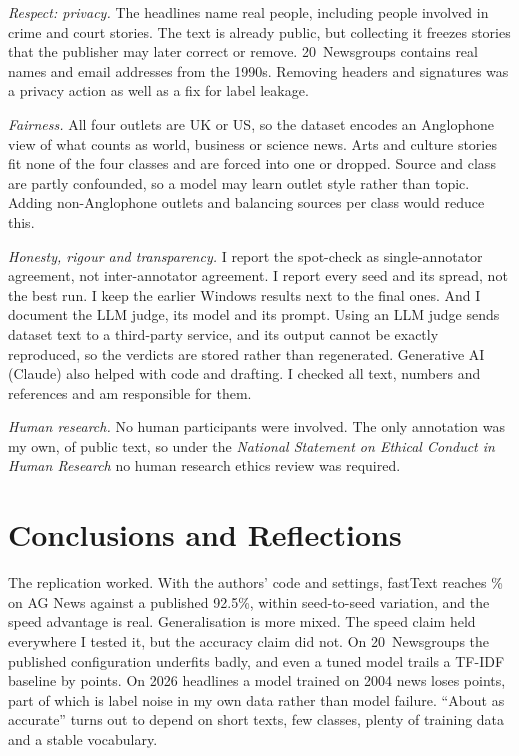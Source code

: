 \documentclass[11pt]{article}
\begin{document}
\emph{Respect: privacy.} The headlines name real people, including people involved in crime
and court stories. The text is already public, but collecting it freezes stories that the
publisher may later correct or remove. 20~Newsgroups contains real names and email addresses
from the 1990s. Removing headers and signatures was a privacy action as well as a fix for
label leakage.

\emph{Fairness.} All four outlets are UK or US, so the dataset encodes an Anglophone view of
what counts as world, business or science news. Arts and culture stories fit none of the four
classes and are forced into one or dropped. Source and class are partly confounded, so a
model may learn outlet style rather than topic. Adding non-Anglophone outlets and balancing
sources per class would reduce this.

\emph{Honesty, rigour and transparency.} I report the spot-check as single-annotator
agreement, not inter-annotator agreement. I report every seed and its spread, not the best
run. I keep the earlier Windows results next to the final ones. And I document the
LLM judge, its model and its prompt. Using an LLM judge sends dataset text to a third-party
service, and its output cannot be exactly reproduced, so the verdicts are stored rather than
regenerated. Generative AI (Claude) also helped with code and drafting. I checked all text,
numbers and references and am responsible for them.

\emph{Human research.} No human participants were involved. The only annotation was my own,
of public text, so under the \emph{National Statement on Ethical Conduct in Human Research}
\citep{nhmrc2023national} no human research ethics review was required.

\section{Conclusions and Reflections}

The replication worked. With the authors' code and settings, fastText reaches \AGbi\% on AG
News against a published 92.5\%, within seed-to-seed variation, and the speed advantage is
real. Generalisation is more mixed. The speed claim held everywhere I tested it, but the
accuracy claim did not. On 20~Newsgroups the published configuration underfits badly, and
even a tuned model trails a TF-IDF baseline by \NGbestGap{} points. On 2026 headlines a model
trained on 2004 news loses \XFdrop{} points, part of which is label noise in my own data
rather than model failure. ``About as accurate'' turns out to depend on short texts, few
classes, plenty of training data and a stable vocabulary.
\end{document}
